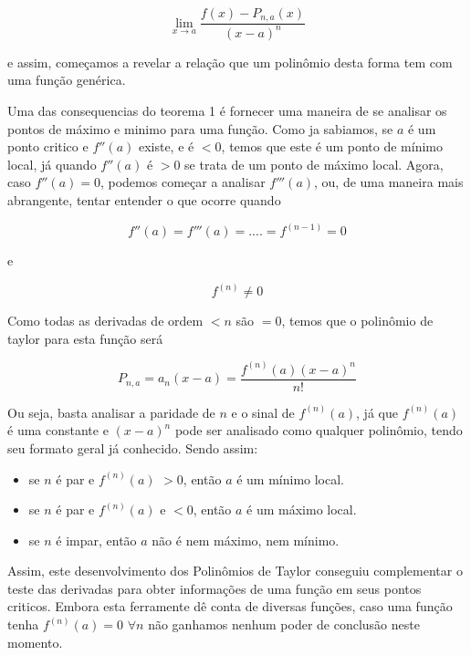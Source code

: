 \documentclass[a4paper, 12pt]{article}
\begin{document}
\begin{equation}
	\lim_{x \to a } \frac{f(x) - P_{n,a}(x)}{(x-a)^n}
\end{equation}

e assim, começamos a revelar a relação que um polinômio desta forma tem com uma
função genérica.

Uma das consequencias do teorema 1 é fornecer uma maneira de se analisar os pontos de
máximo e minimo para uma função. Como ja sabiamos, se $a$ é um ponto critico e $f''(a)$ existe,
e é $ < 0$, temos que este é um ponto de mínimo local, já quando $f''(a)$ é $ > 0$ se trata de um ponto
de máximo local. Agora, caso $f''(a) = 0$, podemos começar a analisar $f'''(a)$, ou,
de uma maneira mais abrangente, tentar entender o que ocorre quando

\begin{equation}
	f''(a) = f'''(a) = .... = f^{(n-1)} = 0
\end{equation}

e

\begin{equation}
	f^{(n)} \neq 0
\end{equation}

Como todas as derivadas de ordem $ < n $ são $=0$, temos que o polinômio de taylor para
esta função será

\begin{equation}
	P_{n,a} = a_n(x-a) = \frac{f^{(n)}(a)(x-a)^n}{n!}
\end{equation}

Ou seja, basta analisar a paridade de $n$ e o sinal de $f^{(n)}(a)$, já que $f^{(n)}(a)$
é uma constante e $(x-a)^n$ pode ser analisado como qualquer polinômio, tendo seu
formato geral já conhecido. Sendo assim:

\begin{itemize}
	\item se $n$ é par e $f^{(n)}(a)$ $>0$, então $a$ é um mínimo local.
	\item se $n$ é par e $f^{(n)}(a)$ e $<0$, então $a$ é um máximo local.
	\item se $n$ é impar, então $a$ não é nem máximo, nem mínimo.
\end{itemize}

Assim, este desenvolvimento dos Polinômios de Taylor conseguiu complementar o teste das
derivadas para obter informações de uma função em seus pontos criticos. Embora esta
ferramente dê conta de diversas funções, caso uma função tenha $f^{(n)}(a) = 0$ $ \forall n$
não ganhamos nenhum poder de conclusão neste momento.
\end{document}
